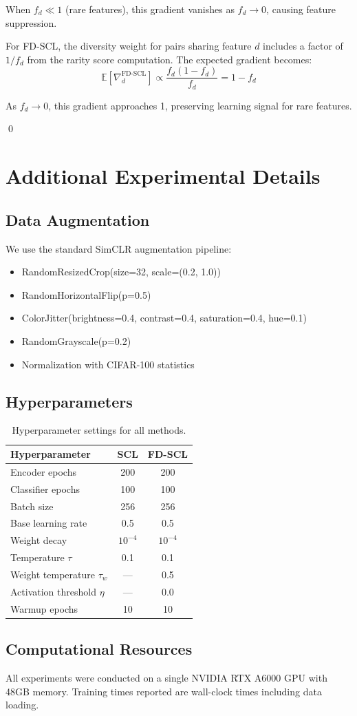\documentclass[11pt,a4paper]{article}
\begin{document}
When $f_d \ll 1$ (rare features), this gradient vanishes as $f_d \to 0$, causing feature suppression.

For FD-SCL, the diversity weight for pairs sharing feature $d$ includes a factor of $1/f_d$ from the rarity score computation. The expected gradient becomes:
\begin{equation}
\mathbb{E}[\nabla_d^{\text{FD-SCL}}] \propto \frac{f_d(1 - f_d)}{f_d} = 1 - f_d
\end{equation}

As $f_d \to 0$, this gradient approaches 1, preserving learning signal for rare features.

\qed

\section{Additional Experimental Details}

\subsection{Data Augmentation}

We use the standard SimCLR augmentation pipeline:
\begin{itemize}
    \item RandomResizedCrop(size=32, scale=(0.2, 1.0))
    \item RandomHorizontalFlip(p=0.5)
    \item ColorJitter(brightness=0.4, contrast=0.4, saturation=0.4, hue=0.1)
    \item RandomGrayscale(p=0.2)
    \item Normalization with CIFAR-100 statistics
\end{itemize}

\subsection{Hyperparameters}

\begin{table}[h]
\centering
\caption{Hyperparameter settings for all methods.}
\begin{tabular}{lcc}
\toprule
Hyperparameter & SCL & FD-SCL \\
\midrule
Encoder epochs & 200 & 200 \\
Classifier epochs & 100 & 100 \\
Batch size & 256 & 256 \\
Base learning rate & 0.5 & 0.5 \\
Weight decay & $10^{-4}$ & $10^{-4}$ \\
Temperature $\tau$ & 0.1 & 0.1 \\
Weight temperature $\tau_w$ & --- & 0.5 \\
Activation threshold $\eta$ & --- & 0.0 \\
Warmup epochs & 10 & 10 \\
\bottomrule
\end{tabular}
\end{table}

\subsection{Computational Resources}

All experiments were conducted on a single NVIDIA RTX A6000 GPU with 48GB memory. Training times reported are wall-clock times including data loading.
\end{document}
